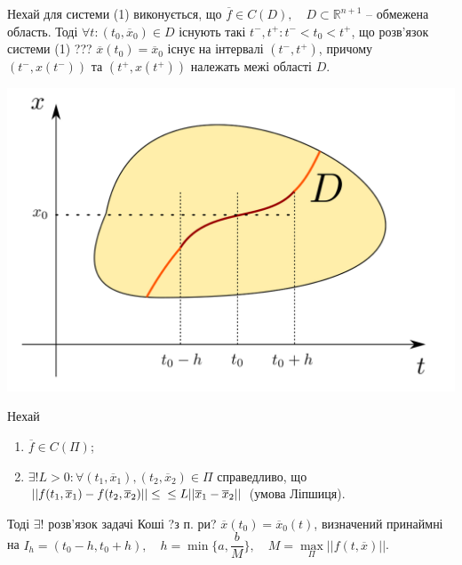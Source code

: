 \documentclass[14pt,a4paper]{scrartcl}
\theoremstyle{definition}
\theoremstyle{remark}
\theoremstyle{definition}
\theoremstyle{definition}
\begin{document}
\begin{boxteo}
Нехай для системи (1) виконується, що $\overline{f} \in C(D), \quad D \subset \mathbb{R}^{n + 1}$ -- обмежена область. Тоді $\forall t : (t_0, \overline{x}_0) \in D$ існують такі $t^{-}, t^{+} : t^{-} < t_0 < t^{+}$, що розв'язок системи (1) ??? $\overline{x}(t_0) = \overline{x}_0$ існує на інтервалі $(t^{-}, t^{+})$, причому $(t^{-}, x(t^{-})) \text{ та } (t^{+}, x(t^{+}))$ належать межі області $D$.
    \begin{center} \includegraphics[scale=0.35]{assets/lect0.png} \end{center}
\end{boxteo}

\begin{boxteo}
  Нехай
  \begin{spacing}{1}
  \begin{enumerate}
    \item $\overline{f} \in C(\Pi)$;
    \item $\exists! L > 0 : \forall (t_1, \overline{x}_1), (t_2, \overline{x}_2) \in \Pi$ справедливо, що $|| f(t_1, \overline{x}_1) - f(t_2, \overline{x}_2)|| \leq \\ \leq L||\overline{x}_1 - \overline{x}_2||$ (умова Ліпшиця).
  \end{enumerate}
  \end{spacing}


  Тоді $\exists!$ розв'язок задачі Коші ?з п. ри? $\overline{x}(t_0) = \overline{x}_0(t)$, визначений принаймні на $I_h = (t_0 - h, t_0 + h), \quad h = \min\{{a, \dfrac{b}{M}}\}, \quad M = \max\limits_{\Pi}||f(t, \overline{x})||$.
\end{boxteo}
\end{document}
